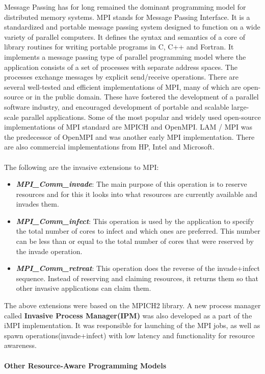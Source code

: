 Message Passing has for long remained the dominant programming model for distributed memory systems. MPI stands for Message Passing Interface. It is a standardized and portable message passing system designed to function on a wide variety of parallel computers. It defines the syntax and semantics of a core of library routines for writing portable programs in C, C++ and Fortran. It implements a message passing type of parallel programming model where the application consists of a set of processes with separate address spaces. The processes exchange messages by explicit send/receive operations. There are several well-tested and efficient implementations of MPI, many of which are open-source or in the public domain. These have fostered the development of a parallel software industry, and encouraged development of portable and scalable large-scale parallel applications. Some of the most popular and widely used open-source implementations of MPI standard are MPICH and OpenMPI. LAM / MPI was the predecessor of OpenMPI and was another early MPI implementation. There are also commercial implementations from HP, Intel and Microsoft.\\  \\
The following are the invasive extensions to MPI:
\begin{itemize}
\item \textbf{\textit{MPI\_Comm\_invade}}: The main purpose of this operation is to reserve resources and for this it looks into what resources are currently available and invades them.
\item \textbf{\textit{MPI\_Comm\_infect}}: This operation is used by the application to specify the total number of cores to infect and which ones are preferred. This number can be less than or equal to the total number of cores that were reserved by the invade operation. 
\item \textbf{\textit{MPI\_Comm\_retreat}}: This operation does the reverse of the invade+infect sequence. Instead of reserving and claiming resources, it returns them so that other invasive applications can claim them.
\end{itemize}
The above extensions were based on the MPICH2 library. A new process manager called \textbf{Invasive Process Manager(IPM)} was also developed as a part of the iMPI implementation. It was responsible for launching of the MPI jobs, as well as spawn operations(invade+infect) with low latency and functionality for resource awareness.\\ \\
\textbf{Other Resource-Aware Programming Models}
